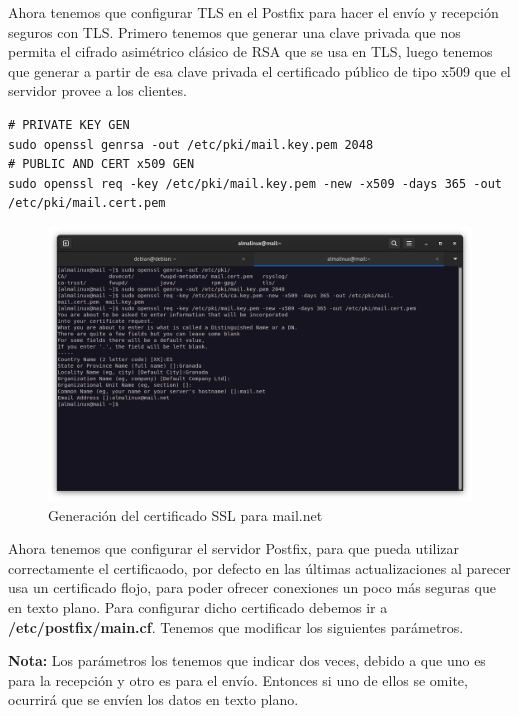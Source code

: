 Ahora tenemos que configurar TLS en el Postfix para hacer el envío y recepción seguros con TLS. Primero tenemos que generar una clave privada que nos permita el cifrado asimétrico clásico de RSA que se usa en TLS, luego tenemos que generar a partir de esa clave privada el certificado público de tipo x509 que el servidor provee a los clientes.

\begin{lstlisting}[style=mybash]
# PRIVATE KEY GEN
sudo openssl genrsa -out /etc/pki/mail.key.pem 2048
# PUBLIC AND CERT x509 GEN
sudo openssl req -key /etc/pki/mail.key.pem -new -x509 -days 365 -out /etc/pki/mail.cert.pem
\end{lstlisting}

\begin{figure}[H]
	\centering
	\includegraphics[scale=0.30]{08}
	\caption{Generación del certificado SSL para mail.net}
\end{figure}

Ahora tenemos que configurar el servidor Postfix, para que pueda utilizar correctamente el certificaodo, por defecto en las últimas actualizaciones al parecer usa un certificado flojo, para poder ofrecer conexiones un poco más seguras que en texto plano. Para configurar dicho certificado debemos ir a \textbf{/etc/postfix/main.cf}. Tenemos que modificar los siguientes parámetros. 

\textbf{Nota:} Los parámetros los tenemos que indicar dos veces, debido a que uno es para la recepción y otro es para el envío. Entonces si uno de ellos se omite, ocurrirá que se envíen los datos en texto plano.

